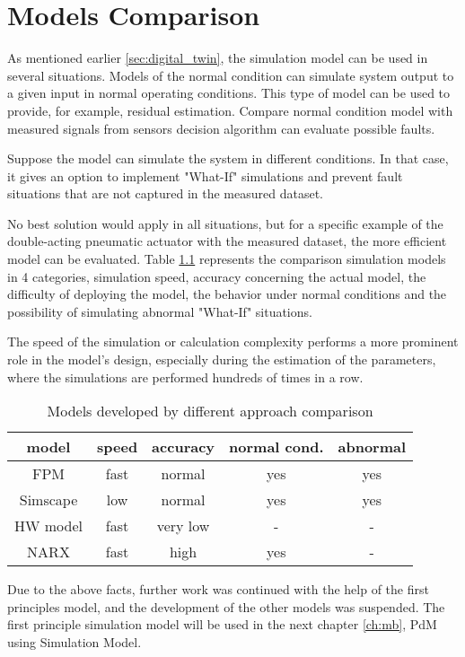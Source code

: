 \chapter{Models Comparison}

As mentioned earlier \ref{sec:digital_twin}, the simulation model can be used in several
situations.  Models of the normal condition can simulate system output to a
given input in normal operating conditions. This type of model can be used
to provide, for example, residual estimation. Compare normal condition
model with measured signals from sensors decision algorithm can evaluate
possible faults. 

Suppose the model can simulate the system in different conditions. In that
case, it gives an option to implement  "What-If" simulations and prevent
fault situations that are not captured in the measured dataset.

No best solution would apply in all situations, but for a specific example
of the double-acting pneumatic actuator with the measured dataset, the more
efficient model can be evaluated. Table \ref{tab:models_compare} represents the comparison
simulation models in 4 categories, simulation speed, accuracy concerning
the actual model, the difficulty of deploying the model, the behavior under
normal conditions and the possibility of simulating abnormal "What-If"
situations.

The speed of the simulation or calculation complexity performs a more
prominent role in the model's design, especially during the estimation of
the parameters, where the simulations are performed hundreds of times in a
row.

\begin{table}[h]
    \centering
    \begin{tabular}{|c|c|c|c|c|}
\hline
\textbf{model} &\textbf{speed} &\textbf{accuracy} &\textbf{normal cond.} &\textbf{abnormal} \\
\hline
FPM            & fast          & normal           & yes                  & yes \\
Simscape       & low           & normal           & yes                  & yes \\
HW model       & fast          & very low         & -                    & - \\
NARX           & fast          & high             & yes                  & - \\
\hline
    \end{tabular}
    \caption{Models developed by different approach comparison}
    \label{tab:models_compare}
\end{table}
    
Due to the above facts, further work was continued with the help of the
first principles model, and the development of the other models was
suspended. The first principle simulation model will be used in the next chapter
\ref{ch:mb}, PdM using Simulation Model.

